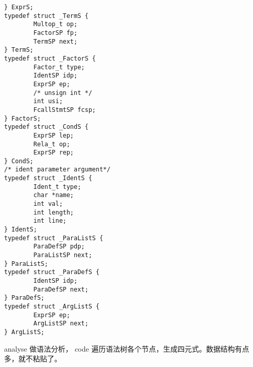 \begin{verbatim}
} ExprS;
typedef struct _TermS {
        Multop_t op;
        FactorSP fp;
        TermSP next;
} TermS;
typedef struct _FactorS {
        Factor_t type;
        IdentSP idp;
        ExprSP ep;
        /* unsign int */
        int usi;
        FcallStmtSP fcsp;
} FactorS;
typedef struct _CondS {
        ExprSP lep;
        Rela_t op;
        ExprSP rep;
} CondS;
/* ident parameter argument*/
typedef struct _IdentS {
        Ident_t type;
        char *name;
        int val;
        int length;
        int line;
} IdentS;
typedef struct _ParaListS {
        ParaDefSP pdp;
        ParaListSP next;
} ParaListS;
typedef struct _ParaDefS {
        IdentSP idp;
        ParaDefSP next;
} ParaDefS;
typedef struct _ArgListS {
        ExprSP ep;
        ArgListSP next;
} ArgListS;
\end{verbatim}
analyse 做语法分析， code 遍历语法树各个节点，生成四元式。数据结构有点
多，就不粘贴了。
